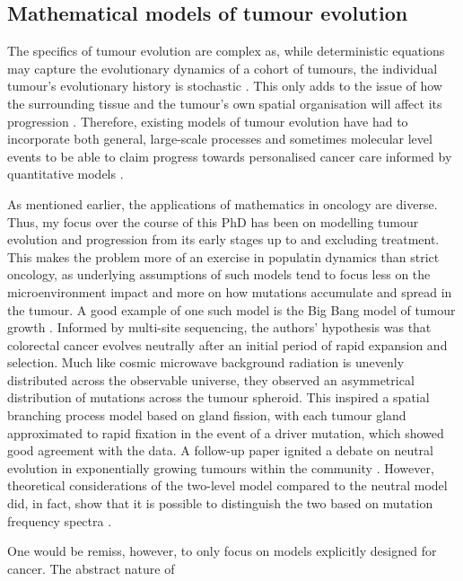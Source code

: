 \subsection{Mathematical models of tumour evolution}
The specifics of tumour evolution are complex as, while deterministic equations may capture the evolutionary
dynamics of a cohort of tumours, the individual tumour's evolutionary history is stochastic
\cite{werner_deterministic_2013}. This only adds to the issue of how the surrounding tissue \cite{west_normal_2021}
and the tumour's own spatial organisation will affect its progression \cite{noble_spatial_2022}. Therefore,
existing models of tumour evolution have had to incorporate both general, large-scale processes and
sometimes molecular level events to be able to claim progress towards personalised cancer care informed
by quantitative models \cite{yin_review_2019}. \par
As mentioned earlier, the applications of mathematics in oncology are diverse. Thus, my focus over the course
of this PhD has been on modelling tumour evolution and progression from its early stages up to and excluding
treatment. This makes the problem more of an exercise in populatin dynamics than strict oncology, as underlying
assumptions of such models tend to focus less on the microenvironment impact and more on how mutations accumulate
and spread in the tumour. A good example of one such model is the Big Bang model of tumour growth \cite{sottoriva_big_2015}.
Informed by multi-site sequencing, the authors' hypothesis was that colorectal cancer evolves neutrally after an initial
period of rapid expansion and selection. Much like cosmic microwave background radiation is unevenly distributed across the
observable universe, they observed an asymmetrical distribution of mutations across the tumour spheroid.
This inspired a spatial branching process model based on gland fission, with each tumour gland approximated to
rapid fixation in the event of a driver mutation, which showed good agreement with the data. A follow-up paper \cite{williams_identification_2016}
ignited a debate on neutral evolution in exponentially growing tumours within the community
\cite{tarabichi_neutral_2018, mcdonald_currently_2018, heide_reply_2018, bozic_measuring_2019}.
However, theoretical considerations of the two-level model compared to the neutral model did, in fact,
show that it is possible to distinguish the two based on mutation frequency spectra \cite{tung_signatures_2021}.\par
One would be remiss, however, to only focus on models explicitly designed for cancer. The abstract nature of
